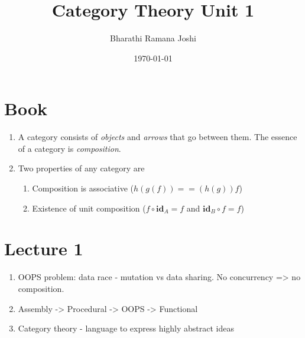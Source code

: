 \documentclass[titlepage, 12pt]{article}
\begin{document}
\title{Category Theory Unit 1}

\author{Bharathi Ramana Joshi}

\date{\today}

\maketitle

\newpage

\section{Book}

\begin{enumerate}
	\item A category consists of \textit{objects} and \textit{arrows} that go
		between them. The essence of a category is \textit{composition}.
	\item Two properties of any category are
		\begin{enumerate}
			\item Composition is associative ($h(g(f)) == (h(g))f$)
			\item Existence of unit composition ($f\circ\textbf{id}_A = f$ and
				$\textbf{id}_B\circ f = f$)
		\end{enumerate}
\end{enumerate}

\section{Lecture 1}

	\begin{enumerate}
		\item OOPS problem: data race - mutation vs data sharing. No
			concurrency => no composition.
		\item Assembly -> Procedural -> OOPS -> Functional
		\item Category theory - language to express highly abstract ideas
	\end{enumerate}
\end{document}
